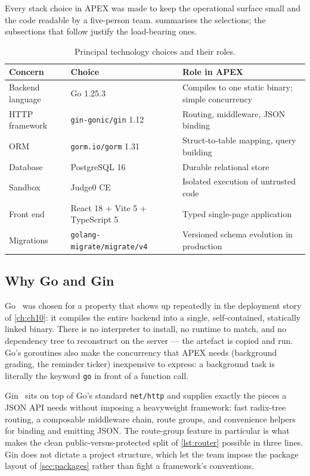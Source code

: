 Every stack choice in APEX was made to keep the operational surface small and
the code readable by a five-person team.  summarises the
selections; the subsections that follow justify the load-bearing ones.

\begin{table}[htbp]
\centering
\caption{Principal technology choices and their roles.}\label{tab:stack}
\begin{tabularx}{\linewidth}{@{}L{3.2cm}L{4.3cm}X@{}}
\toprule
\textbf{Concern} & \textbf{Choice} & \textbf{Role in APEX} \\
\midrule
Backend language & Go 1.25.3 & Compiles to one static binary; simple concurrency \\
HTTP framework & \texttt{gin-gonic/gin} 1.12 & Routing, middleware, JSON binding \\
ORM & \texttt{gorm.io/gorm} 1.31 & Struct-to-table mapping, query building \\
Database & PostgreSQL 16 & Durable relational store \\
Sandbox & Judge0 CE & Isolated execution of untrusted code \\
Front end & React 18 + Vite 5 + TypeScript 5 & Typed single-page application \\
Migrations & \texttt{golang-migrate/migrate/v4} & Versioned schema evolution in production \\
\bottomrule
\end{tabularx}
\end{table}

\subsection{Why Go and Gin}

Go~\cite{go} was chosen for a property that shows up repeatedly in the
deployment story of \cref{ch:ch10}: it compiles the entire backend into a
single, self-contained, statically linked binary. There is no interpreter to
install, no runtime to match, and no dependency tree to reconstruct on the
server --- the artefact is copied and run. Go's goroutines also make the
concurrency that APEX needs (background grading, the reminder ticker)
inexpensive to express: a background task is literally the keyword \texttt{go}
in front of a function call.

Gin~\cite{gin} sits on top of Go's standard \texttt{net/http} and supplies
exactly the pieces a JSON API needs without imposing a heavyweight framework:
fast radix-tree routing, a composable middleware chain, route groups, and
convenience helpers for binding and emitting JSON. The route-group feature in
particular is what makes the clean public-versus-protected split of
\cref{lst:router} possible in three lines. Gin does not dictate a project
structure, which let the team impose the package layout of
\cref{sec:packages} rather than fight a framework's conventions.


